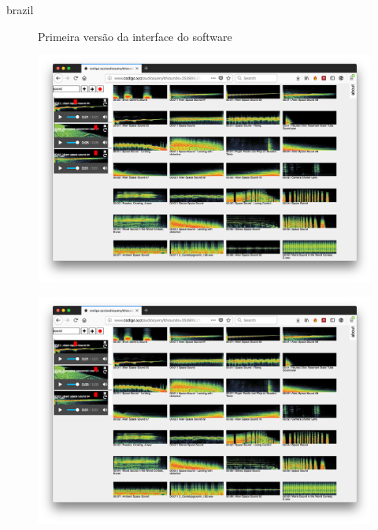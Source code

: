 \begin{otherlanguage*}{brazil}
\begin{figure}[htb]
\label{audiqueryminipage}
\centering
 \begin{minipage}{0.49\textwidth}
   \centering
   \caption{Primeira versão da interface do software} \label{fig_minipage_imagem1}
   \includegraphics[width=\textwidth]{pictures/cap4/audioquery_firefox}
 \end{minipage}
 \hfill
 \begin{minipage}{0.49\textwidth}
   \centering
   \caption{} \label{fig_minipage_grafico2}
   \includegraphics[width=\textwidth]{pictures/cap4/audioquery_firefox}
 \end{minipage}
\end{figure}


\end{otherlanguage*}


